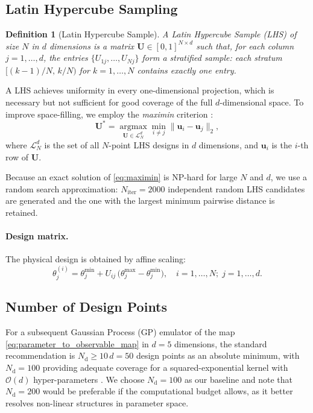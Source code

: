 \documentclass[12pt,a4paper,twoside]{report}
\newtheorem{definition}{Definition}[section]
\begin{document}
\subsection{Latin Hypercube Sampling}
\label{subsec:lhs_definition}

\begin{definition}[Latin Hypercube Sample]
A \emph{Latin Hypercube Sample} (LHS) of size $N$ in $d$ dimensions
is a matrix $\mathbf{U} \in [0,1]^{N \times d}$ such that, for each
column $j = 1, \ldots, d$, the entries
$\{U_{1j}, \ldots, U_{Nj}\}$ form a \emph{stratified} sample: each
stratum $[(k-1)/N,\, k/N)$ for $k = 1, \ldots, N$ contains exactly
one entry.
\end{definition}

A LHS achieves uniformity in every one-dimensional projection, which
is necessary but not sufficient for good coverage of the full
$d$-dimensional space.  To improve space-filling, we employ the
\emph{maximin} criterion \cite{Morris1995}:
\begin{equation}
  \mathbf{U}^* = \operatorname*{argmax}_{\mathbf{U} \in \mathcal{L}_N^d}
    \min_{i \neq j} \|\bm{u}_i - \bm{u}_j\|_2,
  \label{eq:maximin}
\end{equation}
where $\mathcal{L}_N^d$ is the set of all $N$-point LHS designs in
$d$ dimensions, and $\bm{u}_i$ is the $i$-th row of $\mathbf{U}$.

Because an exact solution of \cref{eq:maximin} is NP-hard for large
$N$ and $d$, we use a random search approximation:
$N_\mathrm{iter} = 2000$ independent random LHS candidates are
generated and the one with the largest minimum pairwise distance
is retained.

\paragraph{Design matrix.}
The physical design is obtained by affine scaling:
\begin{equation}
  \theta_j^{(i)} = \theta_j^\mathrm{min}
    + U_{ij}\, \bigl(\theta_j^\mathrm{max} - \theta_j^\mathrm{min}\bigr),
  \quad i = 1,\ldots,N;\; j = 1,\ldots,d.
  \label{eq:lhs_scaling}
\end{equation}

\subsection{Number of Design Points}
\label{subsec:n_design}

For a subsequent Gaussian Process (GP) emulator of the map
\cref{eq:parameter_to_observable_map} in $d = 5$ dimensions, the
standard recommendation is $N_\mathrm{d} \geq 10\,d = 50$ design
points as an absolute minimum, with $N_\mathrm{d} = 100$ providing
adequate coverage for a squared-exponential kernel with $\mathcal{O}(d)$
hyper-parameters \cite{Loeppky2009}.  We choose $N_\mathrm{d} = 100$
as our baseline and note that $N_\mathrm{d} = 200$ would be preferable
if the computational budget allows, as it better resolves non-linear
structures in parameter space.
\end{document}
